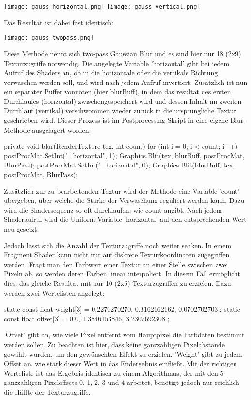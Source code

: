 \texttt{[image: gauss\_horizontal.png]}
\texttt{[image: gauss\_vertical.png]}

Das Resultat ist dabei fast identisch:

\texttt{[image: gauss\_twopass.png]}

Diese Methode nennt sich two-pass Gaussian Blur und es sind hier nur 18 (2x9) Texturzugriffe notwendig. Die angelegte Variable 'horizontal' gibt bei jedem Aufruf des Shaders an, ob in die horizontale oder die vertikale Richtung verwaschen werden soll, und wird nach jedem Aufruf invertiert. Zusätzlich ist nun ein separater Puffer vonnöten (hier blurBuff), in dem das resultat des ersten Durchlaufes (horizontal) zwischengespeichert wird und dessen Inhalt im zweiten Durchlauf (vertikal) verschwommen wieder zurück in die ursprüngliche Textur geschrieben wird. Dieser Prozess ist im Postprocessing-Skript in eine eigene Blur-Methode ausgelagert worden:

\begin{csh}
private void blur(RenderTexture tex, int count)
{
    for (int i = 0; i < count; i++)
    {
        postProcMat.SetInt("_horizontal", 1);
        Graphics.Blit(tex, blurBuff, postProcMat, BlurPass);
        postProcMat.SetInt("_horizontal", 0);
        Graphics.Blit(blurBuff, tex, postProcMat, BlurPass);
    }
}
\end{csh}

Zusätzlich zur zu bearbeitenden Textur wird der Methode eine Variable 'count' übergeben, über welche die Stärke der Verwaschung reguliert werden kann. Dazu wird die Shadersequenz so oft durchlaufen, wie count angibt. Nach jedem Shaderaufruf wird die Uniform Variable 'horizontal' auf den entsprechenden Wert neu gesetzt.

Jedoch lässt sich die Anzahl der Texturzugriffe noch weiter senken. In einem Fragment Shader kann nicht nur auf diskrete Texturkoordinaten zugegriffen werden. Fragt man den Farbwert einer Textur an einer Stelle zwischen zwei Pixeln ab, so werden deren Farben linear interpoliert. In diesem Fall ermöglicht dies, das gleiche Resultat mit nur 10 (2x5) Texturzugriffen zu erzielen. Dazu werden zwei Wertelisten angelegt:
\begin{hlsl}
    static const float weight[3] = { 0.2270270270, 0.3162162162, 0.0702702703 };
    static const float offset[3] = { 0.0, 1.3846153846, 3.2307692308 };
\end{hlsl}
'Offset' gibt an, wie viele Pixel entfernt vom Hauptpixel die Farbdaten bestimmt werden sollen. Zu beachten ist hier, dass keine ganzzahligen Pixelabstände gewählt wurden, um den gewünschten Effekt zu erzielen.
'Weight' gibt zu jedem Offset an, wie stark dieser Wert in das Endergebnis einflie{\ss}t. Mit der richtigen Werteliste ist das Ergebnis identisch zu einem Algorithmus, der mit den 5 ganzzahligen Pixeloffsets 0, 1, 2, 3 und 4 arbeitet, benötigt jedoch nur reichlich die Hälfte der Texturzugriffe.

